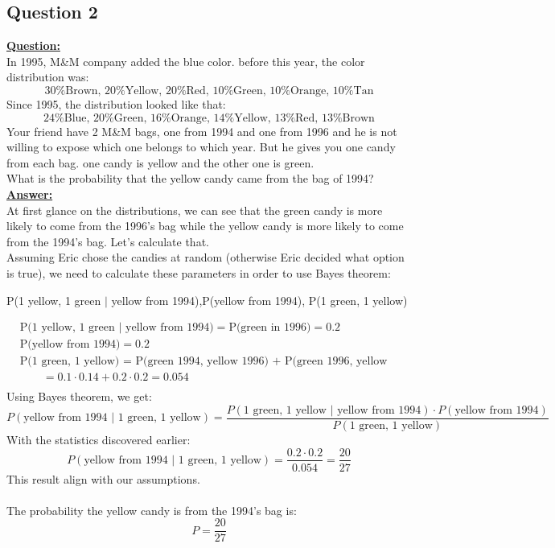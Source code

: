 \documentclass[a4, 12pt,titlepage]{scrartcl}
\begin{document}
\subsection{Question 2}
\textbf{\underline{Question:}}\\
In 1995, M\&M company added the blue color. before this year, the color distribution was:\[
\textrm{30\% Brown, 20\% Yellow, 20\% Red, 10\% Green, 10\% Orange, 10\% Tan}
\]
Since 1995, the distribution looked like that:\[
\textrm{24\% Blue, 20\% Green, 16\% Orange, 14\% Yellow, 13\% Red, 13\% Brown}
\]
Your friend have 2 M\&M bags, one from 1994 and one from 1996 and he is not willing to expose which one belongs to which year. But he gives you one candy from each bag. one candy is yellow and the other one is green.\\
What is the probability that the yellow candy came from the bag of 1994?\\

\textbf{\underline{Answer:}}\\
At first glance on the distributions, we can see that the green candy is more likely to come from the 1996's bag while the yellow candy is more likely to come from the 1994's bag. Let's calculate that.\\

Assuming Eric chose the candies at random (otherwise Eric decided what option is true), we need to calculate these parameters in order to use Bayes theorem:
\begin{center}
\quad P(1 yellow, 1 green $|$ yellow from 1994),\quad P(yellow from 1994), \quad P(1 green, 1 yellow)
\end{center}\smallskip
\begin{align*}
&\textrm{P(1 yellow, 1 green $|$ yellow from 1994)}=\textrm{P(green in 1996)}=0.2\\
&\textrm{P(yellow from 1994)}=0.2\\
&\textrm{P(1 green, 1 yellow) = P(green 1994, yellow 1996) + P(green 1996, yellow 1994)}\\
&\qquad=0.1\cdot 0.14+0.2\cdot 0.2=0.054\\
\end{align*}Using Bayes theorem, we get:\[
P(\textrm{yellow from 1994 $|$ 1 green, 1 yellow})=\frac{P(\textrm{1 green, 1 yellow $|$ yellow from 1994})\cdot P(\textrm{yellow from 1994})}{P(\textrm{1 green, 1 yellow})}
\]
With the statistics discovered earlier:\[
P(\textrm{yellow from 1994 $|$ 1 green, 1 yellow})=\frac{0.2\cdot 0.2}{0.054}=\frac{20}{27}
\]
This result align with our assumptions.\\\smallskip\\
The probability the yellow candy is from the 1994's bag is:
\[
\boxed{P=\frac{20}{27}}
\]
\newpage
\end{document}
